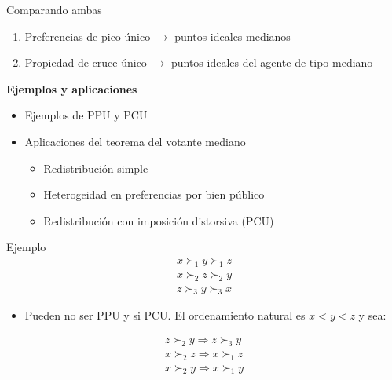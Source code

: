 \documentclass[
  ignorenonframetext,
]{beamer}
\providecommand{\tightlist}{%
  \setlength{\itemsep}{0pt}\setlength{\parskip}{0pt}}\usepackage{longtable,booktabs,array}
\begin{document}
\begin{frame}
\begin{block}{Comparando ambas}
\begin{itemize}
  \begin{enumerate}
  \tightlist
  \item
    Preferencias de pico único \(\longrightarrow\) puntos ideales
    medianos
  \item
    Propiedad de cruce único \(\longrightarrow\) puntos ideales del
    agente de tipo mediano
  \end{enumerate}
\end{itemize}
\end{block}
\end{frame}

\begin{frame}{\textbf{Ejemplos y aplicaciones}}
\protect\hypertarget{ejemplos-y-aplicaciones}{}
\begin{itemize}
\tightlist
\item
  Ejemplos de PPU y PCU
\item
  Aplicaciones del teorema del votante mediano

  \begin{itemize}
  \tightlist
  \item
    Redistribución simple
  \item
    Heterogeidad en preferencias por bien público
  \item
    Redistribución con imposición distorsiva (PCU)
  \end{itemize}
\end{itemize}

\begin{block}{Ejemplo}
\protect\hypertarget{ejemplo}{}
\[\begin{aligned}
x \succ_{1} y \succ_{1} z \\
x \succ_{2} z \succ_{2} y \\
z \succ_{3} y \succ_{3} x
\end{aligned}\]

\begin{itemize}
\tightlist
\item
  Pueden no ser PPU y si PCU. El ordenamiento natural es \(x<y<z\) y
  sea:
\end{itemize}

\[\begin{aligned}
z \succ_{2} y \Rightarrow z \succ_{3} y\\
x \succ_{2} z \Rightarrow x \succ_{1} z\\
x \succ_{2} y \Rightarrow x \succ_{1} y
\end{aligned}\]
\end{block}


\end{frame}
\end{document}
